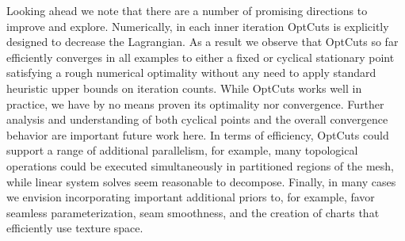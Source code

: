 Looking ahead we note that there are a number of promising directions to improve and explore. Numerically, in each inner iteration OptCuts is explicitly designed to decrease the Lagrangian. As a result we observe that OptCuts so far efficiently converges in all examples to either a fixed or cyclical stationary point satisfying a rough numerical optimality without any need to apply standard heuristic upper bounds on iteration counts. While OptCuts works well in practice, we have by no means proven its optimality nor convergence. 
Further analysis and understanding of both cyclical points and the overall convergence behavior are important future work here. 
In terms of efficiency, OptCuts could support a range of additional parallelism, for example, many topological operations could be executed simultaneously in partitioned regions of the mesh, while linear system solves seem reasonable to decompose. 
Finally, in many cases we envision incorporating important additional priors to, for example, favor seamless parameterization, seam smoothness, and the creation of charts that efficiently use texture space. 

